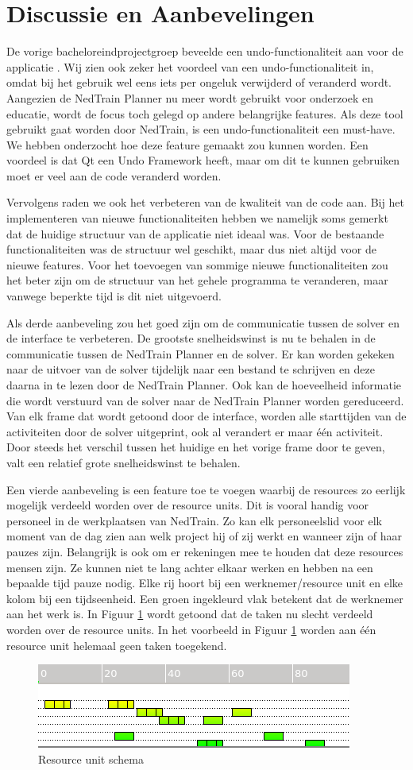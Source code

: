 \section{Discussie en Aanbevelingen}
De vorige bacheloreindprojectgroep beveelde een undo-functionaliteit aan voor de applicatie \cite{bep2012nedtrain}. Wij zien ook zeker het voordeel van een undo-functionaliteit in, omdat bij het gebruik wel eens iets per ongeluk verwijderd of veranderd wordt. Aangezien de NedTrain Planner nu meer wordt gebruikt voor onderzoek en educatie, wordt de focus toch gelegd op andere belangrijke features. Als deze tool gebruikt gaat worden door NedTrain, is een undo-functionaliteit een must-have. We hebben onderzocht hoe deze feature gemaakt zou kunnen worden. Een voordeel is dat Qt een Undo Framework heeft, maar om dit te kunnen gebruiken moet er veel aan de code veranderd worden. 

Vervolgens raden we ook het verbeteren van de kwaliteit van de code aan. Bij het implementeren van nieuwe functionaliteiten hebben we namelijk soms gemerkt dat de huidige structuur van de applicatie niet ideaal was. Voor de bestaande functionaliteiten was de structuur wel geschikt, maar dus niet altijd voor de nieuwe features. Voor het toevoegen van sommige nieuwe functionaliteiten zou het beter zijn om de structuur van het gehele programma te veranderen, maar vanwege beperkte tijd is dit niet uitgevoerd.

Als derde aanbeveling zou het goed zijn om de communicatie tussen de solver en de interface te verbeteren. De grootste snelheidswinst is nu te behalen in de communicatie tussen de NedTrain Planner en de solver. Er kan worden gekeken naar de uitvoer van de solver tijdelijk naar een bestand te schrijven en deze daarna in te lezen door de NedTrain Planner. Ook kan de hoeveelheid informatie die wordt verstuurd van de solver naar de NedTrain Planner worden gereduceerd. Van elk frame dat wordt getoond door de interface, worden alle starttijden van de activiteiten door de solver uitgeprint, ook al verandert er maar \'e\'en activiteit. Door steeds het verschil tussen het huidige en het vorige frame door te geven, valt een relatief grote snelheidswinst te behalen.

Een vierde aanbeveling is een feature toe te voegen waarbij de resources zo eerlijk mogelijk verdeeld worden over de resource units. Dit is vooral handig voor personeel in de werkplaatsen van NedTrain. Zo kan elk personeelslid voor elk moment van de dag zien aan welk project hij of zij werkt en wanneer zijn of haar pauzes zijn. Belangrijk is ook om er rekeningen mee te houden dat deze resources mensen zijn. Ze kunnen niet te lang achter elkaar werken en hebben na een bepaalde tijd pauze nodig. Elke rij hoort bij een werknemer/resource unit en elke kolom bij een tijdseenheid. Een groen ingekleurd vlak betekent dat de werknemer aan het werk is. In Figuur \ref{fig:schema} wordt getoond dat de taken nu slecht verdeeld worden over de resource units. In het voorbeeld in Figuur \ref{fig:schema} worden aan \'e\'en resource unit helemaal geen taken toegekend. 

\begin{figure}[H]
\centering
\includegraphics[width=.5\textwidth]{../images/schedule.png}
\caption{Resource unit schema}
\label{fig:schema}
\end{figure}
